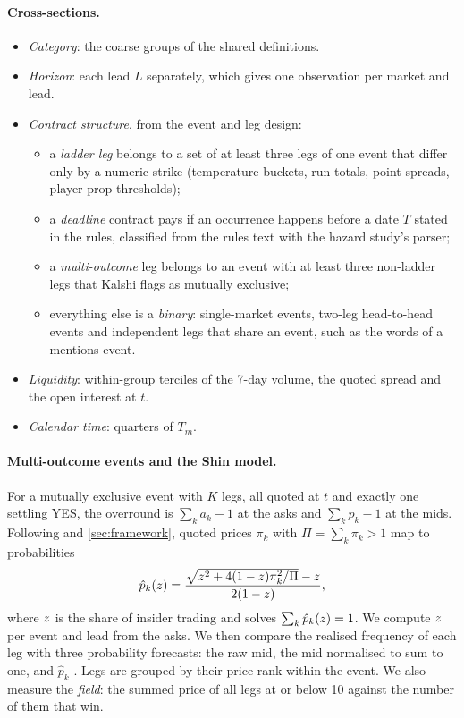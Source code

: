 \paragraph{Cross-sections.}
\begin{itemize}
\item \emph{Category}: the coarse groups of the shared definitions.
\item \emph{Horizon}: each lead $L$ separately, which gives one observation per market and lead.
\item \emph{Contract structure}, from the event and leg design:
  \begin{itemize}
  \item a \emph{ladder leg} belongs to a set of at least three legs of one event that differ only by a
        numeric strike (temperature buckets, run totals, point spreads, player-prop thresholds);
  \item a \emph{deadline} contract pays if an occurrence happens before a date $T$ stated in the
        rules, classified from the rules text with the hazard study's parser;
  \item a \emph{multi-outcome} leg belongs to an event with at least three non-ladder legs that
        Kalshi flags as mutually exclusive;
  \item everything else is a \emph{binary}: single-market events, two-leg head-to-head events and
        independent legs that share an event, such as the words of a mentions event.
  \end{itemize}
\item \emph{Liquidity}: within-group terciles of the 7-day volume, the quoted spread and the open
      interest at $t$.
\item \emph{Calendar time}: quarters of $T_m$.
\end{itemize}

\paragraph{Multi-outcome events and the Shin model.}
For a mutually exclusive event with $K$ legs, all quoted at $t$ and exactly one settling YES, the
overround is $\sum_k a_k-1$ at the asks and $\sum_k p_k-1$ at the mids. Following
\citet{shin1991,shin1993} and \cref{sec:framework}, quoted prices $\pi_k$ with $\Pi=\sum_k\pi_k>1$
map to probabilities
\begin{equation}\label{eq:xs-shin}
  \hat p_k(z)=\frac{\sqrt{z^{2}+4(1-z)\pi_k^{2}/\Pi}-z}{2(1-z)},
\end{equation}
where $z$ is the share of insider trading and solves $\sum_k\hat p_k(z)=1$. We compute
$z$ per event and lead from the asks. We then compare the realised frequency of each leg with
three probability forecasts: the raw mid, the mid normalised to sum to one, and $\hat p_k$
\citep{strumbelj2014}. Legs are grouped by their price rank within the event. We also measure the
\emph{field}: the summed price of all legs at or below 10\cents{} against the number of them that win.


